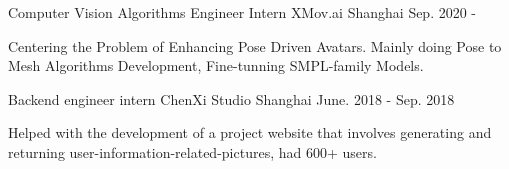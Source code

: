 

\begin{cventries}
  \cventry
    {Computer Vision Algorithms Engineer Intern} %
    {XMov.ai} %
    {Shanghai} %
    {Sep. 2020 - } %
    {
      \begin{cvitems} %
        \item {Centering the Problem of Enhancing Pose Driven Avatars. Mainly doing Pose to Mesh Algorithms Development, Fine-tunning SMPL-family Models.}
      \end{cvitems}
    }

  \cventry
    {Backend engineer intern} %
    {ChenXi Studio} %
    {Shanghai} %
    {June. 2018 - Sep. 2018} %
    {
      \begin{cvitems} %
        \item {Helped with the development of a project website that involves generating and returning user-information-related-pictures, had 600+ users.}
      \end{cvitems}
    }

\end{cventries}
